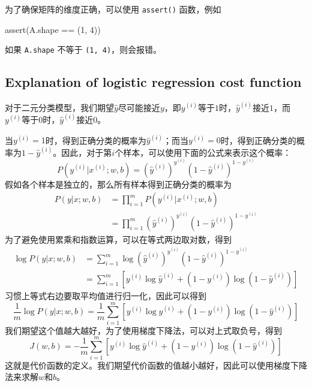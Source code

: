 为了确保矩阵的维度正确，可以使用 \verb|assert()| 函数，例如
\begin{python}
assert(A.shape == (1, 4))
\end{python}
如果 \verb|A.shape| 不等于 \verb|(1, 4)|，则会报错。

\subsection{Explanation of logistic regression cost function}

对于二元分类模型，我们期望$\hat{y}$尽可能接近$y$，即${y}^{(i)}$等于$1$时，$\hat{y}^{(i)}$接近$1$，而${y}^{(i)}$等于$0$时，$\hat{y}^{(i)}$接近$0$。

当$y^{(i)}=1$时，得到正确分类的概率为$\hat{y}^{(i)}$；而当$y^{(i)}=0$时，得到正确分类的概率为$1-\hat{y}^{(i)}$。因此，对于第$i$个样本，可以使用下面的公式来表示这个概率：
\begin{equation}
    P(y^{(i)} | x^{(i)}; w, b) = (\hat{y}^{(i)})^{y^{(i)}} (1-\hat{y}^{(i)})^{1-y^{(i)}}
\end{equation}
假如各个样本是独立的，那么所有样本得到正确分类的概率为
\begin{equation}
    \begin{aligned}
        P(y | x; w, b) &= \prod_{i=1}^{m} P(y^{(i)} | x^{(i)}; w, b)\\
        &= \prod_{i=1}^{m} (\hat{y}^{(i)})^{y^{(i)}} (1-\hat{y}^{(i)})^{1-y^{(i)}}
    \end{aligned}
\end{equation}
为了避免使用累乘和指数运算，可以在等式两边取对数，得到
\begin{equation}
    \begin{aligned}
        \log P(y | x; w, b) &= \sum_{i=1}^{m} \log (\hat{y}^{(i)})^{y^{(i)}} (1-\hat{y}^{(i)})^{1-y^{(i)}}\\
        &= \sum_{i=1}^{m} \left[ y^{(i)} \log \hat{y}^{(i)} + (1-y^{(i)}) \log (1-\hat{y}^{(i)}) \right]
    \end{aligned}
\end{equation}
习惯上等式右边要取平均值进行归一化，因此可以得到
\begin{equation}
    \frac{1}{m} \log P(y | x; w, b) = \frac{1}{m} \sum_{i=1}^{m} \left[ y^{(i)} \log \hat{y}^{(i)} + (1-y^{(i)}) \log (1-\hat{y}^{(i)}) \right]
\end{equation}
我们期望这个值越大越好，为了使用梯度下降法，可以对上式取负号，得到
\begin{equation}
    J(w, b) = - \frac{1}{m} \sum_{i=1}^{m} \left[ y^{(i)} \log \hat{y}^{(i)} + (1-y^{(i)}) \log (1-\hat{y}^{(i)}) \right]
\end{equation}
这就是代价函数的定义。我们期望代价函数的值越小越好，因此可以使用梯度下降法来求解$w$和$b$。

